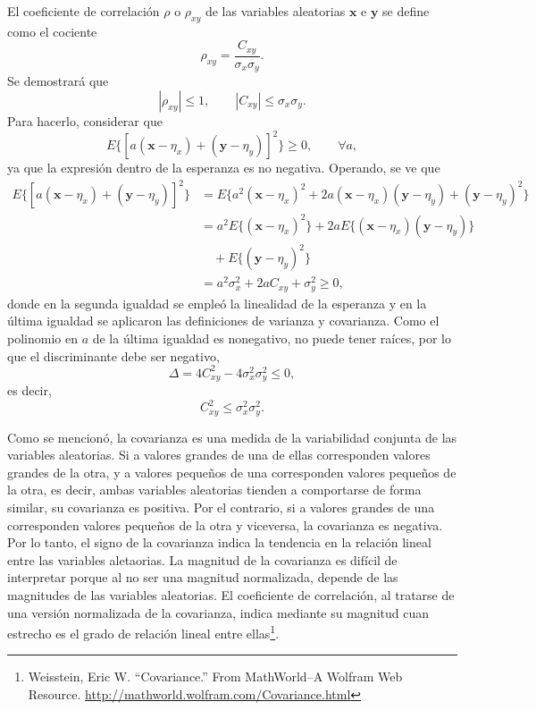 \documentclass[a4paper]{report}
\newcommand{\x}{\mathbf{x}}
\newcommand{\y}{\mathbf{y}}
\begin{document}
El coeficiente de correlación \(\rho\) o \(\rho_{xy}\) de las variables aleatorias \(\x\) e \(\y\) se define como el cociente
\begin{equation}\label{eq:correlation_coefficient_definition}
 \rho_{xy}=\frac{C_{xy}}{\sigma_x\sigma_y}.
\end{equation}
Se demostrará que
\[
 |\rho_{xy}|\leq1,\qquad |C_{xy}|\leq \sigma_x\sigma_y.
\]
Para hacerlo, considerar que
\[
 E\{[a(\x-\eta_x)+(\y-\eta_y)]^2\}\geq 0,\qquad \forall a,
\]
ya que la expresión dentro de la esperanza es no negativa. Operando, se ve que
\small
\begin{align}\label{eq:covariance_rho_relation_deduction}
 E\{[a(\x-\eta_x)+(\y-\eta_y)]^2\}&=E\{a^2(\x-\eta_x)^2+2a(\x-\eta_x)(\y-\eta_y)+(\y-\eta_y)^2\}\nonumber\\
   &=a^2E\{(\x-\eta_x)^2\}+2aE\{(\x-\eta_x)(\y-\eta_y)\}\nonumber\\
   &\quad+E\{(\y-\eta_y)^2\}\nonumber\\
   &=a^2\sigma_x^2+2aC_{xy}+\sigma_y^2\geq0,
\end{align}
\normalsize
donde en la segunda igualdad se empleó la linealidad de la esperanza y en la última igualdad se aplicaron las definiciones de varianza y covarianza. Como el polinomio en \(a\) de la última igualdad es nonegativo, no puede tener raíces, por lo que el discriminante debe ser negativo,
\[
 \Delta=4C_{xy}^2-4\sigma_x^2\sigma_y^2\leq 0,
\]
es decir,
\[
 C_{xy}^2\leq \sigma_x^2\sigma_y^2.
\]

Como se mencionó, la covarianza es una medida de la variabilidad conjunta de las variables aleatorias. Si a valores grandes de una de ellas corresponden valores grandes de la otra, y a valores pequeños de una corresponden valores pequeños de la otra, es decir, ambas variables aleatorias tienden a comportarse de forma similar, su covarianza es positiva. Por el contrario, si a valores grandes de una corresponden valores pequeños de la otra y viceversa, la covarianza es negativa. Por lo tanto, el signo de la covarianza indica la tendencia en la relación lineal entre las variables aletaorias. La magnitud de la covarianza es difícil de interpretar porque al no ser una magnitud normalizada, depende de las magnitudes de las variables aleatorias. El coeficiente de correlación, al tratarse de una versión normalizada de la covarianza, indica mediante su magnitud cuan estrecho es el grado de relación lineal entre ellas\footnote{Weisstein, Eric W. ``Covariance.'' From MathWorld--A Wolfram Web Resource. \url{http://mathworld.wolfram.com/Covariance.html}}.
\end{document}
